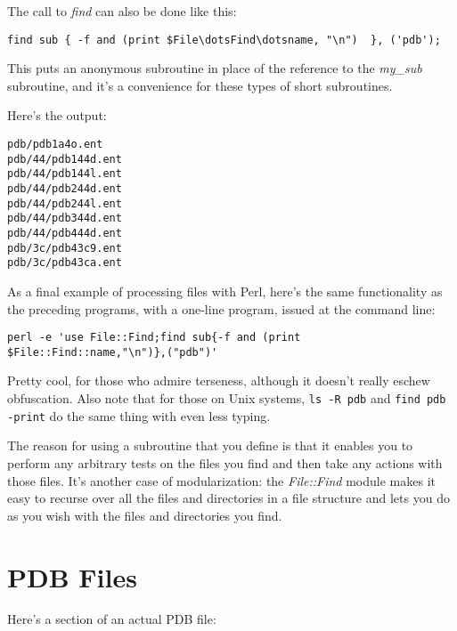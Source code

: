 The call to \textit{find} can also be done like this:

\begin{lstlisting}
find sub { -f and (print $File\dotsFind\dotsname, "\n")  }, ('pdb');
\end{lstlisting}

This puts an anonymous subroutine in place of the reference to the \textit{my\_sub} subroutine, and it's a convenience for these types of short subroutines. 

Here's the output:

\begin{lstlisting}
pdb/pdb1a4o.ent
pdb/44/pdb144d.ent
pdb/44/pdb144l.ent
pdb/44/pdb244d.ent
pdb/44/pdb244l.ent
pdb/44/pdb344d.ent
pdb/44/pdb444d.ent
pdb/3c/pdb43c9.ent
pdb/3c/pdb43ca.ent
\end{lstlisting}

As a final example of processing files with Perl, here's the same functionality as the preceding programs, with a one-line program, issued at the command line: 

\begin{lstlisting}
perl -e 'use File::Find;find sub{-f and (print $File::Find::name,"\n")},("pdb")'
\end{lstlisting}

Pretty cool, for those who admire terseness, although it doesn't really eschew obfuscation. Also note that for those on Unix systems, \verb|ls -R pdb| and \verb|find pdb -print| do the same thing with even less typing.

The reason for using a subroutine that you define is that it enables you to perform any arbitrary tests on the files you find and then take any actions with those files. It's another case of modularization: the \textit{File::Find} module makes it easy to recurse over all the files and directories in a file structure and lets you do as you wish with the files and directories you find. 

\section{PDB Files}
Here's a section of an actual PDB file:

